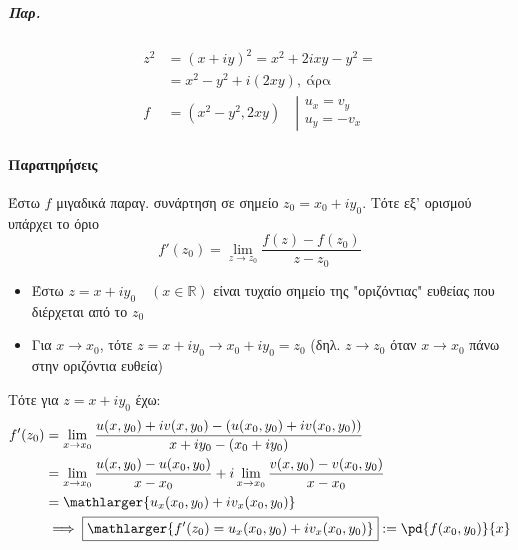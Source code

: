 \documentclass[12pt,a4paper,notitlepage,fleqn]{article}
\begin{document}
    \subparagraph{Παρ.}
    \begin{align*}
    z^2 &= (x+iy)^2=x^2+2ixy-y^2 =
    \\  &= x^2-y^2+i(2xy),\ \text{άρα}\\
    f &= (x^2-y^2,2xy) \quad \left| \begin{array}{l}
    u_x=v_y\\ u_y = -v_x
    \end{array} \right.
    \end{align*}

    \paragraph{Παρατηρήσεις}
    \begin{enumgreekparen}
       	\item
       	Έστω \( f \) μιγαδικά παραγ. συνάρτηση σε σημείο \( z_0=x_0+iy_0 \). Τότε
       	εξ' ορισμού υπάρχει το όριο
       	\[
       	f'(z_0)=\lim_{z\to z_0}\frac{f(z)-f(z_0)}{z-z_0}
       	\]

       	\begin{itemize}
       		\item Έστω \( z=x+iy_0\quad (x\in\mathbb R ) \) είναι τυχαίο σημείο της
       		"οριζόντιας" ευθείας που διέρχεται από το \( z_0 \)
       		\item Για \( x\to x_0 \), τότε \( z=x+iy_0 \to x_0+iy_0=z_0 \)
       		(δηλ. \( z\to z_0 \) όταν \( x\to x_0 \) πάνω στην οριζόντια ευθεία)
       	\end{itemize}


       	Τότε για \( z=x+iy_0 \) έχω:
       	\begin{align*}
       	f'(z_0) &= \lim_{x\to x_0}
       	\frac{u(x,y_0)+iv(x,y_0)-\left(
       		u(x_0,y_0)+iv(x_0,y_0)
       		\right)}{x+iy_0-(x_0+iy_0)}
       	\\ &= \lim_{x\to x_0}\frac{
       		u(x,y_0)-u(x_0,y_0)
       	}{x-x_0}+i\lim_{x\to x_0}\frac{v(x,y_0)-v(x_0,y_0)}{x-x_0}
       	\\ &= \mathlarger{u_x(x_0,y_0)+iv_x(x_0,y_0)}
       	\\ &\implies \boxed{
       		\mathlarger{
       			f'(z_0) = u_x(x_0,y_0)+iv_x(x_0,y_0)
       		}
       	} := \pd{f(x_0,y_0)}{x}
       	\end{align*}


\end{enumgreekparen}
\end{document}
